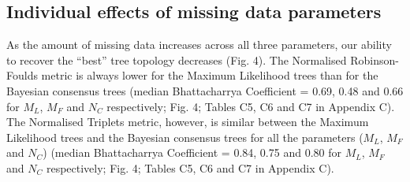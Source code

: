 \documentclass[12pt,letterpaper]{article}
\begin{document}


\subsection{Individual effects of missing data parameters}
As the amount of missing data increases across all three parameters, our ability to recover the ``best'' tree topology decreases (Fig. 4).
The Normalised Robinson-Foulds metric is always lower for the Maximum Likelihood trees than for the Bayesian consensus trees (median Bhattacharrya Coefficient = 0.69, 0.48 and 0.66 for $M_{L}$, $M_{F}$ and $N_{C}$ respectively; Fig. 4; Tables C5, C6 and C7 in Appendix C). 
The Normalised Triplets metric, however, is similar between the Maximum Likelihood trees and the Bayesian consensus trees for all the parameters ($M_{L}$, $M_{F}$ and $N_{C}$) (median Bhattacharrya Coefficient = 0.84, 0.75 and 0.80 for $M_{L}$, $M_{F}$ and $N_{C}$ respectively; Fig. 4; Tables C5, C6 and C7 in Appendix C).
\end{document}
